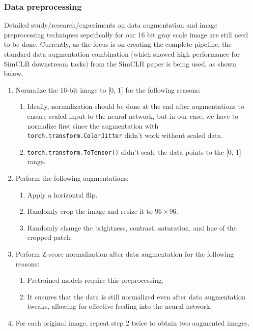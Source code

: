 \documentclass[12pt,twoside,a4paper,parskip]{scrbook} %
\begin{document}
\subsubsection{Data preprocessing}
\label{subsec:data preprocessing}

Detailed study/research/experiments on data augmentation and image preprocessing techniques sepcifically for our 16 bit gray scale image are still need to be done.
Currently, as the focus is on creating the complete pipeline, the standard data augmentation combination (which showed high performance for SimCLR downstream tasks) from the SimCLR \cite{chen2020simple} paper is being used, as shown below.

\begin{enumerate}
  \item Normalize the 16-bit image to [0, 1] for the following reasons:
  \begin{enumerate}
      \item Ideally, normalization should be done at the end after augmentations to ensure scaled input to the neural network, but in our case, we have to normalize first since the augmentation with \texttt{torch.transform.ColorJitter} didn't work without scaled data.
      \item \texttt{torch.transform.ToTensor()} didn't scale the data points to the [0, 1] range.
  \end{enumerate}
  
  \item Perform the following augmentations:
  \begin{enumerate}
      \item Apply a horizontal flip.
      \item Randomly crop the image and resize it to $96 \times 96$.
      \item Randomly change the brightness, contrast, saturation, and hue of the cropped patch.
  \end{enumerate}

  \item Perform Z-score normalization after data augmentation for the following reasons:
  \begin{enumerate}
      \item Pretrained models require this preprocessing.
      \item It ensures that the data is still normalized even after data augmentation tweaks, allowing for effective feeding into the neural network.
  \end{enumerate}

  \item For each original image, repeat step 2 twice to obtain two augmented images.
\end{enumerate}
\end{document}
